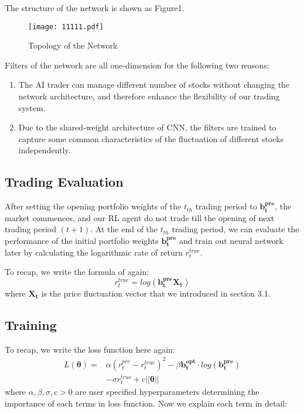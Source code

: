\documentclass{gapd}
\begin{document}
The structure of the network is shown as Figure1.
\begin{figure} [htp]
\centering
\texttt{[image: 11111.pdf]}
\caption{Topology of the Network}
\label{fig:graph}
\end{figure}

Filters of the network are all one-dimension for the following two reasons:
\begin{enumerate}[1)]
\item The AI trader can manage different number of stocks without changing the network architecture, and therefore enhance the flexibility of our trading system. 
\item Due to the shared-weight architecture of CNN, the filters are trained to capture some common characteristics of the fluctuation of different stocks independently. 
\end{enumerate}

\subsection{Trading Evaluation}

After setting the opening portfolio weights of the $t_{th}$ trading period to $\mathbf{b_t^{pre}}$, the market commences, and our RL agent do not trade till the opening of next trading period $(t+1)$. At the end of the $t_{th}$ trading period, we can evaluate the performance of the initial portfolio weights $\mathbf{b_t^{pre}}$ and train out neural network later by calculating the logarithmic rate of return $r_t^{true}$.

To recap, we write the formula of again:
\begin{equation}
r_t^{true}=log(\mathbf{b_t^{pre}}\mathbf{X_t})
\end{equation}
where $\mathbf{X_t}$ is the price fluctuation vector that we introduced in section 3.1.    

\subsection{Training}

To recap, we write the loss function here again:
\begin{equation}
\begin{aligned}
L(\boldsymbol{\theta})=&\alpha (r_t^{pre}-r_t^{true})^2- \beta \mathbf{b_t^{opt}}\cdot log(\mathbf{b_t^{pre}})\\
& - \sigma r_t^{true}+ c \vert \vert \boldsymbol{\theta} \vert \vert 
\end{aligned}\tag{7}
\end{equation}
where $\alpha, \beta, \sigma, c>0$ are user specified hyperparameters determining the importance of each terms in loss function. Now we explain each term in detail:
\end{document}

